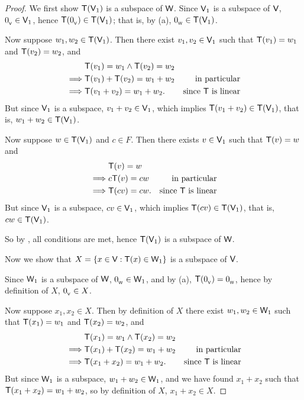 \begin{proof}
We first show \(\textsf{T}(\textsf{V}_1)\) is a subspace of \(\textsf{W}\).
Since \(\textsf{V}_1\) is a subspace of \(\textsf{V}\), \(0_{_{\textsf{V}}} \in \textsf{V}_1\), hence \(\textsf{T}(0_{_{\textsf{V}}}) \in \textsf{T}(\textsf{V}_1)\);
that is, by (a), \(0_{_{\textsf{W}}} \in \textsf{T}(\textsf{V}_1)\).

Now suppose \(w_1, w_2 \in \textsf{T}(\textsf{V}_1)\).
Then there exist \(v_1, v_2 \in \textsf{V}_1\) such that \(\textsf{T}(v_1) = w_1\) and \(\textsf{T}(v_2) = w_2\), and
\begin{align*}
             & \textsf{T}(v_1) = w_1 \land \textsf{T}(v_2) = w_2 \\
    \implies & \textsf{T}(v_1) + \textsf{T}(v_2) = w_1 + w_2 & \text{in particular} \\
    \implies & \textsf{T}(v_1 + v_2) = w_1 + w_2. & \text{since \(\textsf{T}\) is linear}
\end{align*}
But since \(\textsf{V}_1\) is a subspace, \(v_1 + v_2 \in \textsf{V}_1\), which implies \(\textsf{T}(v_1 + v_2) \in \textsf{T}(\textsf{V}_1)\), that is, \(w_1 + w_2 \in \textsf{T}(\textsf{V}_1)\).

Now suppose \(w \in \textsf{T}(\textsf{V}_1)\) and \(c \in F\).
Then there exists \(v \in \textsf{V}_1\) such that \(\textsf{T}(v) = w\) and
\begin{align*}
             & \textsf{T}(v) = w \\
    \implies & c\textsf{T}(v) = cw & \text{in particular} \\
    \implies & \textsf{T}(cv) = cw. & \text{since \(\textsf{T}\) is linear}
\end{align*}
But since \(\textsf{V}_1\) is a subspace, \(cv \in \textsf{V}_1\), which implies \(\textsf{T}(cv) \in \textsf{T}(\textsf{V}_1)\), that is, \(cw \in \textsf{T}(\textsf{V}_1)\).

So by , all conditions are met, hence \(\textsf{T}(\textsf{V}_1)\) is a subspace of \(\textsf{W}\).

Now we show that \(X = \{ x \in \textsf{V}: \textsf{T}(x) \in \textsf{W}_1 \}\) is a subspace of \(\textsf{V}\).

Since \(\textsf{W}_1\) is a subspace of \(\textsf{W}\), \(0_{_{\textsf{W}}} \in \textsf{W}_1\), and by (a), \(\textsf{T}(0_{_{\textsf{V}}}) = 0_{_{\textsf{W}}}\), hence by definition of \(X\), \(0_{_{\textsf{V}}} \in X\).

Now suppose \(x_1, x_2 \in X\).
Then by definition of \(X\) there exist \(w_1, w_2 \in \textsf{W}_1\) such that \(\textsf{T}(x_1) = w_1\) and \(\textsf{T}(x_2) = w_2\), and
\begin{align*}
             & \textsf{T}(x_1) = w_1 \land \textsf{T}(x_2) = w_2 \\
    \implies & \textsf{T}(x_1) + \textsf{T}(x_2) = w_1 + w_2 & \text{in particular} \\
    \implies & \textsf{T}(x_1 + x_2) = w_1 + w_2. & \text{since \(\textsf{T}\) is linear}
\end{align*}
But since \(\textsf{W}_1\) is a subspace, \(w_1 + w_2 \in \textsf{W}_1\), and we have found \(x_1 + x_2\) such that \(\textsf{T}(x_1 + x_2) = w_1 + w_2\), so by definition of \(X\), \(x_1 + x_2 \in X\).


\end{proof}
